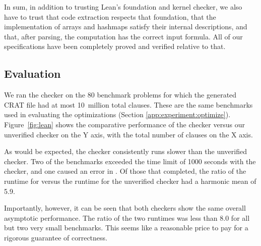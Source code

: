 In sum, in addition to trusting Lean's foundation and kernel checker,
we also have to trust that code extraction respects that foundation,
that the implementation of arrays and hashmaps satisfy their internal descriptions,
and that, after parsing, the computation has the correct input formula.
All of our specifications have been completely proved and verified relative to that.

\subsection{Evaluation}



We ran the \lean{} checker on the 80 benchmark problems for which the
generated CRAT file had at most 10~million total clauses.  These are the
same benchmarks used in evaluating the optimizations (Section
\ref{app:experiment:optimize}).  Figure~\ref{fig:lean} shows the
comparative performance of the \lean{} checker versus our unverified
checker on the Y axis, with the total number of clauses on the X axis.

As would be expected, the \lean{} checker consistently runs slower
than the unverified checker.  Two of the benchmarks exceeded the time
limit of 1000 seconds with the \lean{} checker, and one caused an error in \lean{}.
Of those that
completed, the ratio of the runtime for \lean{} versus the runtime for
the unverified checker had a harmonic mean of 5.9.

Importantly, however, it can be seen that both checkers show the same
overall asymptotic performance.  The ratio of the two runtimes was
less than $8.0$ for all but two very small benchmarks.  This seems like a
reasonable price to pay for a rigorous guarantee of correctness.



